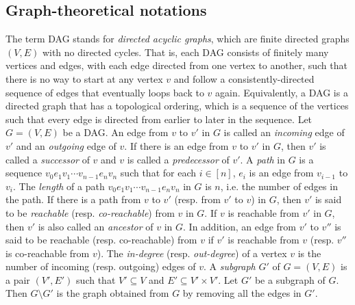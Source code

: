 \subsection*{Graph-theoretical notations}
The term DAG stands for \emph{directed acyclic graphs}, which are finite directed graphs $(V, E)$ with no directed cycles. That is, each DAG consists of finitely many vertices and edges, with each edge directed from one vertex to another, such that there is no way to start at any vertex $\mathit{v}$ and follow a consistently-directed sequence of edges that eventually loops back to $\mathit{v}$ again. Equivalently, a DAG is a directed graph that has a topological ordering, which is a sequence of the vertices such that every edge is directed from earlier to later in the sequence. Let $G=(V,E)$ be a DAG. An edge from $\mathit{v}$ to $\mathit{v'}$ in $G$ is called an \emph{incoming} edge of $\mathit{v'}$ and an \emph{outgoing} edge of $\mathit{v}$. If there is an edge from $\mathit{v}$ to $\mathit{v'}$ in $G$, then $\mathit{v'}$ is called a \emph{successor} of $\mathit{v}$ and $\mathit{v}$ is called a \emph{predecessor} of $\mathit{v'}$. A \emph{path} in $G$ is a sequence $\mathit{v}_0 \mathit{e}_1 \mathit{v}_1 \cdots \mathit{v}_{n-1} \mathit{e}_n \mathit{v}_n$ such that for each $i \in [n]$, $e_i$ is an edge from $\mathit{v}_{i-1}$ to $\mathit{v}_i$. The \emph{length} of a path $\mathit{v}_0 e_1 \mathit{v}_1 \cdots \mathit{v}_{n-1} e_n \mathit{v}_n$ in $G$ is $n$, i.e. the number of edges in the path. If there is a path from $\mathit{v}$ to $\mathit{v'}$ (resp. from $\mathit{v'}$ to $\mathit{v}$) in $G$, then $\mathit{v'}$ is said to be \emph{reachable} (resp. \emph{co-reachable}) from $\mathit{v}$ in $G$. If $\mathit{v}$ is reachable from $\mathit{v'}$ in $G$, then $\mathit{v'}$ is also called an \emph{ancestor} of $\mathit{v}$ in $G$. In addition, an edge from $\mathit{v'}$ to $\mathit{v''}$ is said to be reachable (resp. co-reachable) from $\mathit{v}$ if $\mathit{v'}$ is reachable from $\mathit{v}$ (resp. $\mathit{v''}$ is co-reachable from $\mathit{v}$). The \emph{in-degree} (resp. \emph{out-degree}) of a vertex $\mathit{v}$ is the number of incoming (resp. outgoing) edges of $\mathit{v}$. 
A \emph{subgraph} $G'$ of $G=(V,E)$ is a pair $(V', E')$ such that $V' \subseteq V$ and $E' \subseteq V' \times V'$. Let $G'$ be a subgraph of $G$. Then $G \setminus G'$ is the graph obtained from $G$ by removing all the edges in $G'$. 


